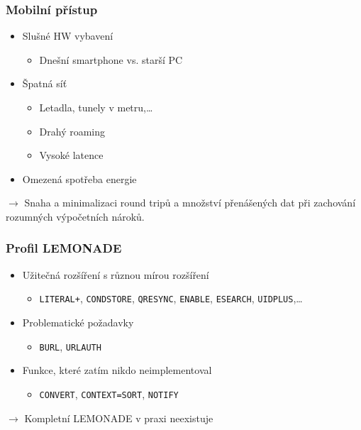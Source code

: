 \documentclass{beamer}
\begin{document}
\begin{frame}[fragile]
  \frametitle{Mobilní přístup}
  \begin{itemize}
    \item Slušné HW vybavení
      \begin{itemize}
        \item Dnešní smartphone vs. starší PC
      \end{itemize}
    \item Špatná síť
      \begin{itemize}
        \item Letadla, tunely v metru,\ldots
        \item Drahý roaming
        \item Vysoké latence
      \end{itemize}
    \item Omezená spotřeba energie
  \end{itemize}

   {
  \begin{center}
  \vspace{4mm}
  $\rightarrow$ \alert{Snaha a minimalizaci round tripů a množství přenášených dat při zachování rozumných výpočetních
  nároků.}
  \end{center}}
\end{frame}

\begin{frame}[fragile]
  \frametitle{Profil LEMONADE}
  \begin{itemize}
    \item Užitečná rozšíření s různou mírou rozšíření
      \begin{itemize}
        \item {\tt LITERAL+}, {\tt CONDSTORE}, {\tt QRESYNC}, {\tt ENABLE}, {\tt ESEARCH}, {\tt UIDPLUS},\ldots
      \end{itemize}
    \item Problematické požadavky
      \begin{itemize}
        \item {\tt BURL}, {\tt URLAUTH}
      \end{itemize}
    \item Funkce, které zatím nikdo neimplementoval
      \begin{itemize}
        \item {\tt CONVERT}, {\tt CONTEXT=SORT}, {\tt NOTIFY}
      \end{itemize}
  \end{itemize}

   {
  \begin{center}
  \vspace{4mm}
  $\rightarrow$ \alert{Kompletní LEMONADE v praxi neexistuje}
  \end{center}}
\end{frame}
\end{document}
